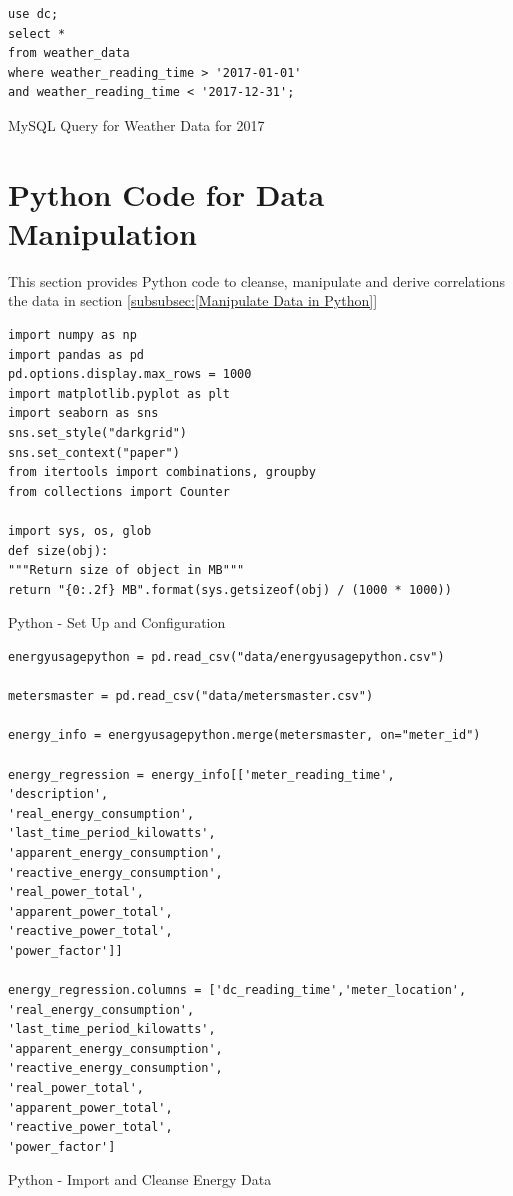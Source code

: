 \documentclass[12pt]{scrartcl}
\begin{document}
\begin{listing}[H]
\begin{verbatim}
use dc; 
select * 
from weather_data
where weather_reading_time > '2017-01-01'
and weather_reading_time < '2017-12-31';
\end{verbatim}
\caption{MySQL Query for Weather Data for 2017}
\label{list:[MySQL Query for Weather Data for 2017]}
\end{listing}

\section{Python Code for Data Manipulation}
\label{sec:[Python Code]}
This section provides Python code to cleanse, manipulate and derive correlations the data in section \ref{subsubsec:[Manipulate Data in Python]}

\begin{listing}[H]
\begin{verbatim}
import numpy as np
import pandas as pd
pd.options.display.max_rows = 1000
import matplotlib.pyplot as plt
import seaborn as sns
sns.set_style("darkgrid")
sns.set_context("paper")
from itertools import combinations, groupby
from collections import Counter

import sys, os, glob
def size(obj):
"""Return size of object in MB"""
return "{0:.2f} MB".format(sys.getsizeof(obj) / (1000 * 1000))
\end{verbatim}
\caption{Python - Set Up and Configuration}
\label{list:[Python - Set up and Configuration]}
\end{listing}

\begin{listing}[H]
\begin{verbatim}
energyusagepython = pd.read_csv("data/energyusagepython.csv")

metersmaster = pd.read_csv("data/metersmaster.csv")

energy_info = energyusagepython.merge(metersmaster, on="meter_id")

energy_regression = energy_info[['meter_reading_time',
'description',
'real_energy_consumption',
'last_time_period_kilowatts',
'apparent_energy_consumption',
'reactive_energy_consumption',
'real_power_total',
'apparent_power_total',
'reactive_power_total',
'power_factor']]

energy_regression.columns = ['dc_reading_time','meter_location',
'real_energy_consumption',
'last_time_period_kilowatts',
'apparent_energy_consumption',
'reactive_energy_consumption',
'real_power_total',
'apparent_power_total',
'reactive_power_total',
'power_factor']

\end{verbatim}
\caption{Python - Import and Cleanse Energy Data}
\label{list:[Python - Import and Cleanse Energy Data]}
\end{listing}
\end{document}
